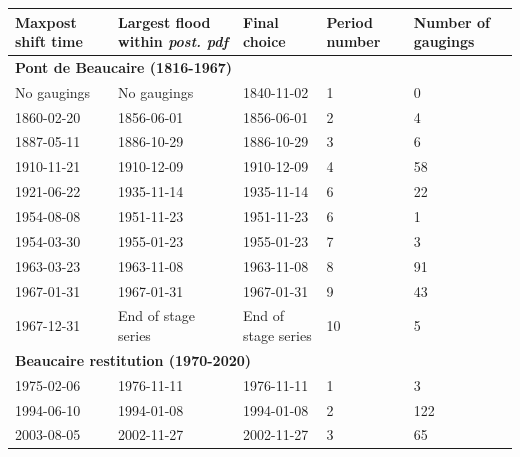 \documentclass[11pt]{article}
\begin{document}
    \begin{center}
        \begin{table}[h!]
        \centering
            \begin{tabular}{|m{2.5cm}|m{3.5cm}|m{3.5cm}|m{1.5cm}|m{2.2cm}|}
                \firsthline
                \textbf{Maxpost shift time}  &  \textbf{Largest flood within \textit{post. pdf}} &  \textbf{Final choice} & \textbf{Period number} & \textbf{Number of gaugings}  \\
                \hline
                \multicolumn{5}{|l|}{\textbf{Pont de Beaucaire (1816-1967)}} \\
                \hline
                No gaugings     &      No gaugings   &   1840-11-02 & 1 & 0 \\
                \hline
                1860-02-20     &       1856-06-01  &   1856-06-01   & 2 & 4 \\
                \hline
                1887-05-11     &       1886-10-29  &   1886-10-29   & 3 & 6\\
                \hline
                1910-11-21     &       1910-12-09  &   1910-12-09  & 4 & 58 \\
                \hline
                1921-06-22     &       1935-11-14  &   1935-11-14   & 6 & 22 \\
                \hline
                1954-08-08    &       1951-11-23  &   1951-11-23   & 6 & 1\\
                \hline
                1954-03-30     &       1955-01-23  &   1955-01-23   & 7 & 3 \\
                \hline
                1963-03-23     &       1963-11-08  &   1963-11-08   & 8 & 91 \\
                \hline
                1967-01-31     &       1967-01-31  &   1967-01-31  & 9 & 43\\
                \hline
                1967-12-31      &       End of stage series & End of stage series & 10 & 5\\
                \hline
                \multicolumn{5}{|l|}{\textbf{Beaucaire restitution (1970-2020)}} \\
                \hline
                1975-02-06     &       1976-11-11  &   1976-11-11 & 1 & 3\\
                \hline
                1994-06-10     &       1994-01-08  &   1994-01-08   & 2 & 122 \\
                \hline
                2003-08-05     &       2002-11-27  &   2002-11-27  & 3 & 65 \\

\end{tabular}
\end{table}
\end{center}
\end{document}
